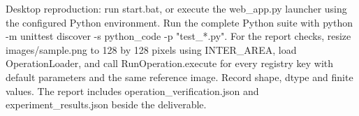 Desktop reproduction: run start.bat, or execute the web\_app.py launcher using the configured Python environment. Run the complete Python suite with python -m unittest discover -s python\_code -p "test\_*.py". For the report checks, resize images/sample.png to 128 by 128 pixels using INTER\_AREA, load OperationLoader, and call RunOperation.execute for every registry key with default parameters and the same reference image. Record shape, dtype and finite values. The report includes operation\_verification.json and experiment\_results.json beside the deliverable.